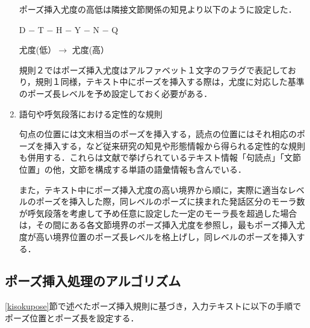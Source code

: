 \begin{enumerate}
\vspace{0.3cm}

ポーズ挿入尤度の高低は隣接文節関係の知見より以下のように設定した．

\begin{center}

D − T − H − Y − N − Q

尤度(低）\qquad $\longrightarrow$  \qquad 尤度(高）

\end{center}

規則２ではポーズ挿入尤度はアルファベット１文字のフラグで表記しており，規則１同様，テキスト中にポーズを挿入する際は，尤度に対応した基準のポーズ長レベルを予め設定しておく必要がある．
\item {\gt 語句や呼気段落における定性的な規則}

句点の位置には文末相当のポーズを挿入する，読点の位置にはそれ相応のポーズを挿入する，など従来研究の知見や形態情報から得られる定性的な規則も併用する．これらは文献\cite{箱田1989}で挙げられているテキスト情報「句読点」「文節位置」の他，文節を構成する単語の語彙情報も含んでいる．

また，テキスト中にポーズ挿入尤度の高い境界から順に，実際に適当なレベルのポーズを挿入した際，同レベルのポーズに挟まれた発話区分のモーラ数が呼気段落を考慮して予め任意に設定した一定のモーラ長を超過した場合は，その間にある各文節境界のポーズ挿入尤度を参照し，最もポーズ挿入尤度が高い境界位置のポーズ長レベルを格上げし，同レベルのポーズを挿入する．

\end{enumerate}

\subsection{ポーズ挿入処理のアルゴリズム}
\label{algopose}

\ref{kisokupose}節で述べたポーズ挿入規則に基づき，入力テキストに以下の手順でポーズ位置とポーズ長を設定する．

\vspace{0.3cm}

